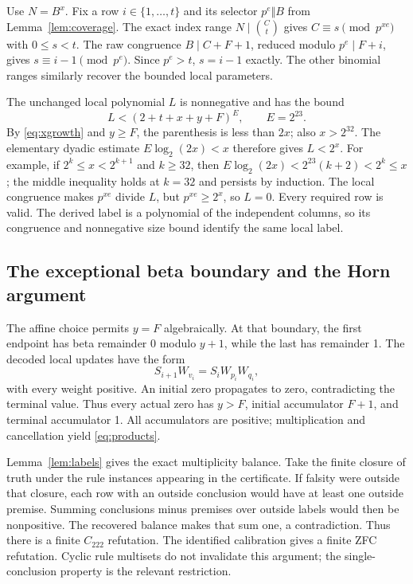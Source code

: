 Use $N=B^x$. Fix a row $i\in\{1,\ldots,t\}$ and its selector
$p^e\Vert B$ from Lemma~\ref{lem:coverage}. The exact index range
$N\mid\binom Ct$ gives $C\equiv s\pmod{p^{xe}}$ with $0\le s<t$.
The raw congruence $B\mid C+F+1$, reduced modulo $p^e\mid F+i$,
gives $s\equiv i-1\pmod{p^e}$. Since $p^e>t$, $s=i-1$ exactly.
The other binomial ranges similarly recover the bounded local parameters.

The unchanged local polynomial $L$ is nonnegative and has the bound
\[
 L<(2+t+x+y+F)^E,\qquad E=2^{23}.
\]
By \eqref{eq:xgrowth} and $y\ge F$, the parenthesis is less than $2x$;
also $x>2^{32}$. The elementary dyadic estimate
$E\log_2(2x)<x$ therefore gives $L<2^x$. For example, if
$2^k\le x<2^{k+1}$ and $k\ge32$, then
$E\log_2(2x)<2^{23}(k+2)<2^k\le x$; the middle inequality holds at
$k=32$ and persists by induction. The local congruence makes $p^{xe}$
divide $L$, but $p^{xe}\ge2^x$, so $L=0$. Every required row is valid.
The derived label is a polynomial of the independent columns, so its
congruence and nonnegative size bound identify the same local label.

\subsection{The exceptional beta boundary and the Horn argument}

The affine choice permits $y=F$ algebraically. At that boundary, the
first endpoint has beta remainder 0 modulo $y+1$, while the last has
remainder 1. The decoded local updates have the form
\[
 S_{i+1}W_{v_i}=S_iW_{p_i}W_{q_i},
\]
with every weight positive. An initial zero propagates to zero, contradicting
the terminal value. Thus every actual zero has $y>F$, initial accumulator
$F+1$, and terminal accumulator 1. All accumulators are positive;
multiplication and cancellation yield \eqref{eq:products}.

Lemma~\ref{lem:labels} gives the exact multiplicity balance. Take the
finite closure of truth under the rule instances appearing in the certificate.
If falsity were outside that closure, each row with an outside conclusion
would have at least one outside premise. Summing conclusions minus premises
over outside labels would then be nonpositive. The recovered balance makes
that sum one, a contradiction. Thus there is a finite $C_{222}$ refutation.
The identified calibration gives a finite ZFC refutation. Cyclic rule
multisets do not invalidate this argument; the single-conclusion property
is the relevant restriction.

